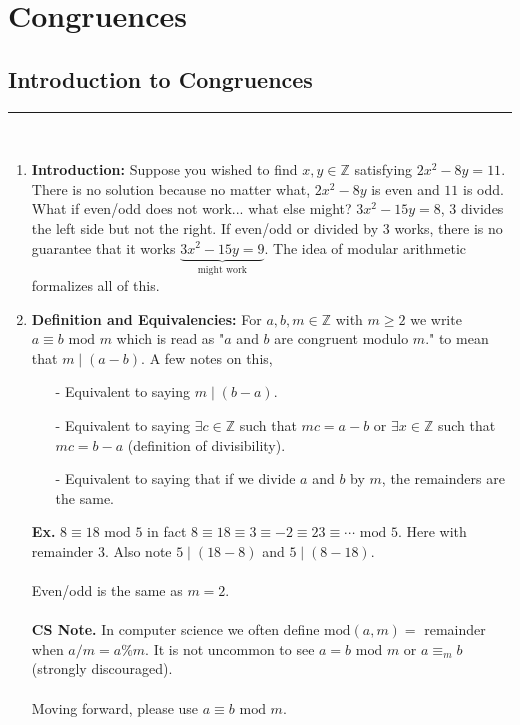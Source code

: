\documentclass[class=article, crop=false]{standalone}
\def\integers{{\mathbb Z}}
\begin{document}
\setcounter{section}{3}
\section{Congruences}

\subsection{Introduction to Congruences}
\rule{\textwidth}{1pt}\\
\begin{enumerate}[1.]
	\item \textbf{Introduction:} Suppose you wished to find $x,y\in\integers$ satisfying $2x^2 -8y=11$. There is no solution
	because no matter what, $2x^2 -8y$ is even and $11$ is odd. What if even/odd does not work...
	what else might? $3x^2-15y=8$, 3 divides the left side but not the right.
	If even/odd or divided by 3 works, there is no guarantee that it works 
	$\underbrace{3x^2-15y=9}_{\text{might work}}$.
	The idea of modular arithmetic formalizes all of this.

	\item \textbf{Definition and Equivalencies:} 
	For $a,b,m\in\integers$ with $m\geq2$ we write $a\equiv b\mbox{ mod }m$ which is
	read as "$a$ and $b$ are congruent modulo $m$." to mean that $m\mid (a-b)$. A few notes on this,
	\begin{itemize}
		\item[-] Equivalent to saying $m\mid (b-a)$.
		\item[-] Equivalent to saying $\exists c\in\integers$ such that $mc=a-b$ or $\exists x\in\integers$
		such that $mc=b-a$ (definition of divisibility).
		\item[-] Equivalent to saying that if we divide $a$ and $b$ by $m$, the remainders are the same.
	\end{itemize}
	\textbf{Ex.} $8\equiv 18\mbox{ mod } 5$ in fact $8\equiv18\equiv3\equiv-2\equiv23\equiv\cdots\mbox{ mod }5$.
	Here with remainder 3. Also note $5\mid (18-8)$ and $5\mid (8-18)$.\\\\
	Even/odd is the same as $m=2$.\\\\
	\textbf{CS Note.} In computer science we often define $\mbox{mod}(a,m)= $ remainder when $a/m=a\%m$.
	It is not uncommon to see $a=b\mbox{ mod }m$ or $a\equiv_m b$ (strongly discouraged).\\\\
	Moving forward, please use $a\equiv b\mbox{ mod }m$.
	

\end{enumerate}
\end{document}

